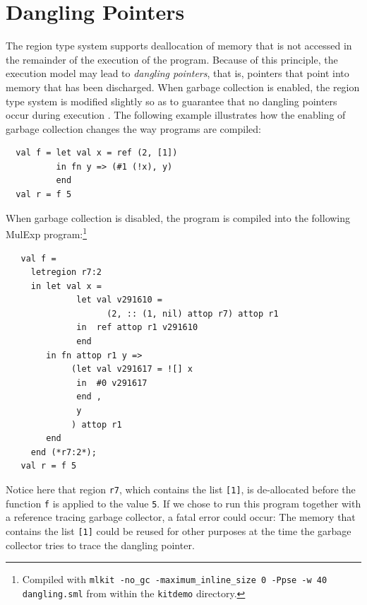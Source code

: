 \documentclass[12pt]{book}
\begin{document}
\section{Dangling Pointers}
The region type system supports deallocation of memory that is not
accessed in the remainder of the execution of the program. Because of
this principle, the execution model may lead to {\em dangling
  pointers}, that is, pointers that point into memory that has been
discharged. When garbage collection is enabled, the region type system
is modified slightly so as to guarantee that no dangling pointers
occur during execution \cite{elsman:tldi03}. The following example
illustrates how the enabling of garbage collection changes the way
programs are compiled:
\begin{verbatim}
  val f = let val x = ref (2, [1])
          in fn y => (#1 (!x), y)
          end 
  val r = f 5
\end{verbatim}
When garbage collection is disabled, the program is compiled into the
following MulExp program:\footnote{Compiled with {\tt mlkit -no\_gc
    -maximum\_inline\_size 0 -Ppse -w 40 dangling.sml} from within the
  {\tt kitdemo} directory.}
\begin{verbatim}
   val f = 
     letregion r7:2 
     in let val x = 
              let val v291610 = 
                    (2, :: (1, nil) attop r7) attop r1
              in  ref attop r1 v291610
              end 
        in fn attop r1 y => 
             (let val v291617 = ![] x
              in  #0 v291617
              end , 
              y
             ) attop r1
        end  
     end (*r7:2*); 
   val r = f 5
\end{verbatim}
Notice here that region {\tt r7}, which contains the list {\tt [1]},
is de-allocated before the function {\tt f} is applied to the value
{\tt 5}. If we chose to run this program together with a reference
tracing garbage collector, a fatal error could occur: The memory that
contains the list {\tt [1]} could be reused for other purposes at the
time the garbage collector tries to trace the dangling pointer.
\end{document}
